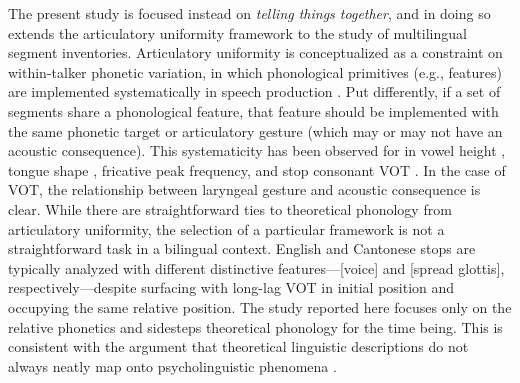 The present study is focused instead on \textit{telling things together}, and in doing so extends the articulatory uniformity framework to the study of multilingual segment inventories. Articulatory uniformity is conceptualized as a constraint on within-talker phonetic variation, in which phonological primitives (e.g., features) are implemented systematically in speech production \citep{chodroff_2017_structure,faytak_2018_uniformity,menard_2008_invariance}. Put differently, if a set of segments share a phonological feature, that feature should be implemented with the same phonetic target or articulatory gesture (which may or may not have an acoustic consequence). This systematicity has been observed for in vowel height \citep{menard_2008_invariance}, tongue shape \citep{faytak_2018_uniformity}, fricative peak frequency, and stop consonant VOT \citep{chodroff_2017_structure}. In the case of VOT, the relationship between laryngeal gesture and acoustic consequence is clear. While there are straightforward ties to theoretical phonology from articulatory uniformity, the selection of a particular framework is not a straightforward task in a bilingual context. English and Cantonese stops are typically analyzed with different distinctive features---[voice] and [spread glottis], respectively---despite surfacing with long-lag VOT in initial position and occupying the same relative position. The study reported here focuses only on the relative phonetics and sidesteps theoretical phonology for the time being. This is consistent with the argument that theoretical linguistic descriptions do not always neatly map onto psycholinguistic phenomena \citep{samuel_2020_resist}.


